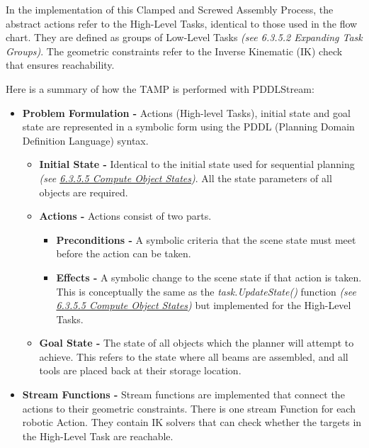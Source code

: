 In the implementation of this Clamped and Screwed Assembly Process, the abstract actions refer to the High-Level Tasks, identical to those used in the flow chart. They are defined as groups of Low-Level Tasks \textit{(see 6.3.5.2 Expanding Task Groups)}. The geometric constraints refer to the Inverse Kinematic (IK) check that ensures reachability. 

Here is a summary of how the TAMP is performed with PDDLStream:

\begin{itemize}
	\item \textbf{Problem Formulation - }Actions (High-level Tasks), initial state and goal state are represented in a symbolic form using the PDDL (Planning Domain Definition Language) syntax.

\begin{itemize}
	\item \textbf{Initial State - }Identical to the initial state used for sequential planning \textit{(see \uline{6.3.5.5 Compute Object States})}. All the state parameters of all objects are required.

	\item \textbf{Actions - }Actions consist of two parts. 

\begin{itemize}
	\item \textbf{Preconditions - }A symbolic criteria that the scene state must meet before the action can be taken. 

	\item \textbf{Effects - }A symbolic change to the scene state if that action is taken. This is conceptually the same as the \textit{task.UpdateState()} function \textit{(see \uline{6.3.5.5 Compute Object States})} but implemented for the High-Level Tasks.

\end{itemize}
	\item \textbf{Goal State - }The state of all objects which the planner will attempt to achieve. This refers to the state where all beams are assembled, and all tools are placed back at their storage location.

\end{itemize}
	\item \textbf{Stream Functions - }Stream functions are implemented that connect the actions to their geometric constraints. There is one stream Function for each robotic Action. They contain IK solvers that can check whether the targets in the High-Level Task are reachable.


\end{itemize}
